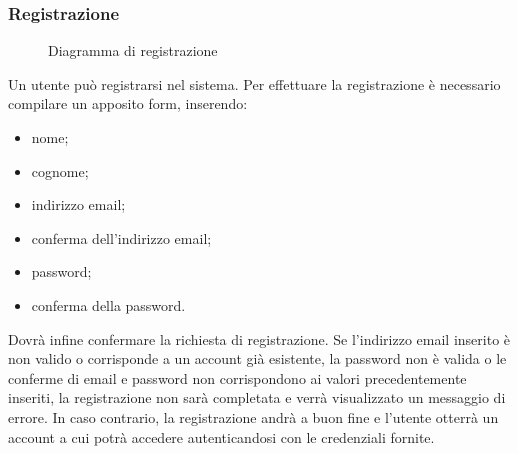 \documentclass[a4paper, titlepage]{article}
\begin{document}
\subsubsection{Registrazione}
\begin{figure}[H]
	\centering
	\noindent{}
	\caption{Diagramma di registrazione}
\end{figure}
Un utente può registrarsi nel sistema. Per effettuare la registrazione è necessario compilare un apposito form, inserendo:
\begin{itemize}
	\item nome;
	\item cognome;
	\item indirizzo email;
	\item conferma dell'indirizzo email;
	\item password;
	\item conferma della password.
\end{itemize}
Dovrà infine confermare la richiesta di registrazione. 
Se l’indirizzo email inserito è non valido o corrisponde a un account già esistente, la password non è valida o le conferme di email e password non corrispondono ai valori precedentemente inseriti, la registrazione non sarà completata e verrà visualizzato un messaggio di errore. 
In caso contrario, la registrazione andrà a buon fine e l’utente otterrà un account a cui potrà accedere autenticandosi con le credenziali fornite. 
\end{document}
